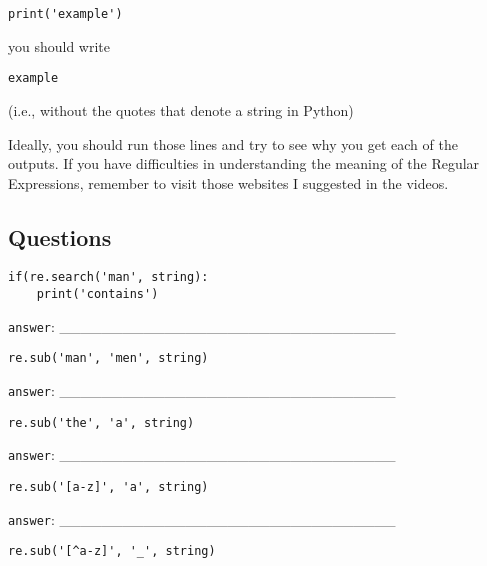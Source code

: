 \documentclass[a4paper,11pt]{scrartcl}
\begin{document}
\begin{verbatim}
print('example')
\end{verbatim}

you should write

\begin{verbatim}
example
\end{verbatim}

(i.e., without the quotes that denote a string in Python)

Ideally, you should run those lines and try to see why you get each of
the outputs. If you have difficulties in understanding the meaning of the
Regular Expressions, remember to visit those websites I suggested in the
videos. 


\subsection{Questions}


\begin{verbatim}
if(re.search('man', string):
    print('contains')
\end{verbatim}

\verb|answer|: \_\_\_\_\_\_\_\_\_\_\_\_\_\_\_\_\_\_\_\_\_\_\_\_\_\_\_\_\_\_\_\_
 

\begin{verbatim}
re.sub('man', 'men', string)
\end{verbatim}

\verb|answer|: \_\_\_\_\_\_\_\_\_\_\_\_\_\_\_\_\_\_\_\_\_\_\_\_\_\_\_\_\_\_\_\_
 

\begin{verbatim}
re.sub('the', 'a', string)
\end{verbatim}
  
\verb|answer|: \_\_\_\_\_\_\_\_\_\_\_\_\_\_\_\_\_\_\_\_\_\_\_\_\_\_\_\_\_\_\_\_
 

\begin{verbatim}
re.sub('[a-z]', 'a', string)
\end{verbatim}
  
\verb|answer|: \_\_\_\_\_\_\_\_\_\_\_\_\_\_\_\_\_\_\_\_\_\_\_\_\_\_\_\_\_\_\_\_
 

\begin{verbatim}
re.sub('[^a-z]', '_', string)
\end{verbatim}
  
\end{document}
